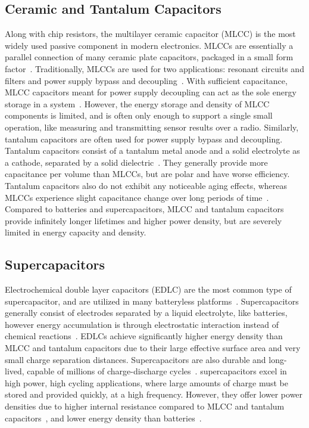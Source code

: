 \subsection{Ceramic and Tantalum Capacitors}
Along with chip resistors, the multilayer ceramic capacitor (MLCC) is the most widely used passive component in modern electronics. MLCCs are essentially a parallel connection of many ceramic plate capacitors, packaged in a small form factor~\cite{pan2010brief}. Traditionally, MLCCs are used for two applications: resonant circuits and filters and power supply bypass and decoupling~\cite{pan2010brief}. With sufficient capacitance, MLCC capacitors meant for power supply decoupling can act as the sole energy storage in a system~\cite{hesterFlicker17,yervaGrafting12,campbellEnergy14}. However, the energy storage and density of MLCC components is limited, and is often only enough to support a single small operation, like measuring and transmitting sensor results over a radio. Similarly, tantalum capacitors are often used for power supply bypass and decoupling. Tantalum capacitors consist of a tantalum metal anode and a solid electrolyte as a cathode, separated by a solid dielectric~\cite{gill1994basic}. They generally provide more capacitance per volume than MLCCs, but are polar and have worse efficiency.
Tantalum capacitors also do not exhibit any noticeable aging effects, whereas MLCCs experience slight capacitance change over long periods of time~\cite{kemetUpdate}.
Compared to batteries and supercapacitors, MLCC and tantalum capacitors provide infinitely longer lifetimes and higher power density, but are severely limited in energy capacity and density.

\subsection{Supercapacitors}
Electrochemical double layer capacitors (EDLC) are the most common type of supercapacitor, and are utilized in many batteryless platforms~\cite{colinReconfigurable18,libich2018supercapacitors,nardello2019camaroptera, fraternali2018pible}.
Supercapacitors generally consist of electrodes separated by a liquid electrolyte, like batteries, however energy accumulation is through electrostatic interaction instead of chemical reactions~\cite{libich2018supercapacitors,vangari2013supercapacitors}.
EDLCs achieve significantly higher energy density than MLCC and tantalum capacitors due to their large effective surface area and very small charge separation distances. Supercapacitors are also durable and long-lived, capable of millions of charge-discharge cycles~\cite{libich2018supercapacitors}. 
supercapacitors excel in high power, high cycling applications, where large amounts of charge must be stored and provided quickly, at a high frequency.
However, they offer lower power densities due to higher internal resistance compared to MLCC and tantalum capacitors~\cite{vangari2013supercapacitors}, and lower energy density than batteries~\cite{murataCap,LTODatasheet}. 

